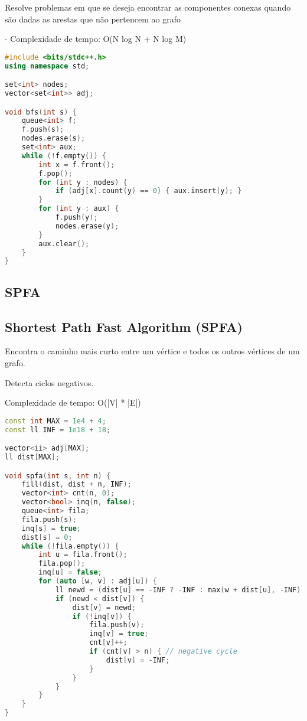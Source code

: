 \documentclass[11pt, a4paper, twoside]{article}
\begin{document}
Resolve problemas em que se deseja encontrar as componentes conexas quando são dadas as arestas que não pertencem ao grafo

- Complexidade de tempo: O(N log N + N log M)

\begin{lstlisting}[language=C++]
#include <bits/stdc++.h>
using namespace std;

set<int> nodes;
vector<set<int>> adj;

void bfs(int s) {
    queue<int> f;
    f.push(s);
    nodes.erase(s);
    set<int> aux;
    while (!f.empty()) {
        int x = f.front();
        f.pop();
        for (int y : nodes) {
            if (adj[x].count(y) == 0) { aux.insert(y); }
        }
        for (int y : aux) {
            f.push(y);
            nodes.erase(y);
        }
        aux.clear();
    }
}
\end{lstlisting}

\subsection{SPFA}

\subsection{Shortest Path Fast Algorithm (SPFA)}


Encontra o caminho mais curto entre um vértice e todos os outros vértices de um grafo.

Detecta ciclos negativos.

Complexidade de tempo: O(|V| * |E|)

\begin{lstlisting}[language=C++]
const int MAX = 1e4 + 4;
const ll INF = 1e18 + 18;

vector<ii> adj[MAX];
ll dist[MAX];

void spfa(int s, int n) {
    fill(dist, dist + n, INF);
    vector<int> cnt(n, 0);
    vector<bool> inq(n, false);
    queue<int> fila;
    fila.push(s);
    inq[s] = true;
    dist[s] = 0;
    while (!fila.empty()) {
        int u = fila.front();
        fila.pop();
        inq[u] = false;
        for (auto [w, v] : adj[u]) {
            ll newd = (dist[u] == -INF ? -INF : max(w + dist[u], -INF));
            if (newd < dist[v]) {
                dist[v] = newd;
                if (!inq[v]) {
                    fila.push(v);
                    inq[v] = true;
                    cnt[v]++;
                    if (cnt[v] > n) { // negative cycle
                        dist[v] = -INF;
                    }
                }
            }
        }
    }
}
\end{lstlisting}
\end{document}
